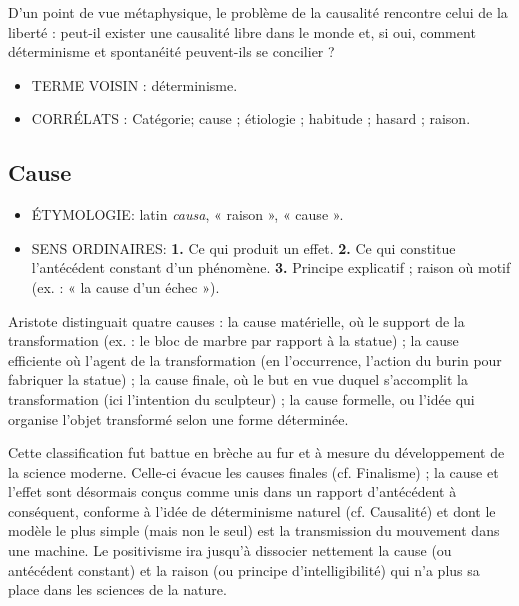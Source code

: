 D'un point de vue métaphysique, le problème
de la causalité rencontre celui de
la liberté : peut-il exister une causalité
libre dans le monde et, si oui, comment
déterminisme et spontanéité peuvent-ils
se concilier ?

\begin{itemize}[leftmargin=1cm, label=, itemsep=1pt]
\item {\footnotesize TERME VOISIN} : déterminisme.
\end{itemize}


\begin{itemize}[leftmargin=1cm, label=, itemsep=1pt]
\item {\footnotesize CORRÉLATS} : Catégorie; cause ;
étiologie ; habitude ; hasard ; raison.
\end{itemize}

\subsection{Cause}

\begin{itemize}[leftmargin=1cm, label=, itemsep=1pt]
\item {\footnotesize ÉTYMOLOGIE}: latin {\it causa}, « raison », « cause ».
\item {\footnotesize SENS ORDINAIRES}: {\bf 1.} Ce qui produit un effet. {\bf 2.} Ce qui
constitue l’antécédent constant d’un
phénomène. {\bf 3.} Principe explicatif ;
raison où motif (ex. : « la cause d’un
échec »).
\end{itemize}

Aristote distinguait quatre causes : la
cause matérielle, où le support de la
transformation (ex. : le bloc de marbre
par rapport à la statue) ; la cause efficiente
où l'agent de la transformation
(en l'occurrence, l’action du burin pour
fabriquer la statue) ; la cause finale, où
le but en vue duquel s’accomplit la
transformation (ici l'intention du sculpteur) ;
la cause formelle, ou l'idée qui
organise l’objet transformé selon une
forme déterminée.

Cette classification fut battue en brèche
au fur et à mesure du développement de
la science moderne. Celle-ci évacue les
causes finales (cf. Finalisme) ; la cause
et l'effet sont désormais conçus comme
unis dans un rapport d’antécédent à
conséquent, conforme à l’idée de déterminisme
naturel (cf. Causalité) et dont
le modèle le plus simple (mais non le
seul) est la transmission du mouvement
dans une machine. Le positivisme ira
jusqu’à dissocier nettement la cause (ou
antécédent constant) et la raison (ou
principe d’intelligibilité) qui n’a plus sa
place dans les sciences de la nature.

